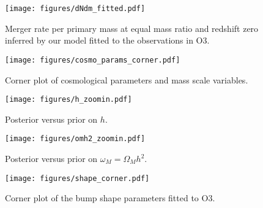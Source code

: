 \documentclass[modern]{aastex631}
\begin{document}
\begin{figure}
    \begin{center}
        \texttt{[image: figures/dNdm\_fitted.pdf]}
    \end{center}
    \caption{Merger rate per primary mass at equal mass ratio and redshift zero inferred by our model fitted to the observations in O3.}
    \label{fig:dNdm_fitted}
\end{figure}

\begin{figure}
    \begin{center}
        \texttt{[image: figures/cosmo\_params\_corner.pdf]}
    \end{center}
    \caption{Corner plot of cosmological parameters and mass scale variables.}
    \label{fig:cosmo-params-corner}
\end{figure}

\begin{figure}
    \begin{center}
        \texttt{[image: figures/h\_zoomin.pdf]}
    \end{center}
    \caption{Posterior versus prior on $h$.}
    \label{fig:h-zoomin}
\end{figure}

\begin{figure}
    \begin{center}
        \texttt{[image: figures/omh2\_zoomin.pdf]}
    \end{center}
    \caption{Posterior versus prior on $\omega_M = \Omega_M h^2$.}
    \label{fig:omh2-zoomin}
\end{figure}

\begin{figure}
    \begin{center}
        \texttt{[image: figures/shape\_corner.pdf]}
    \end{center}
    \caption{Corner plot of the bump shape parameters fitted to O3.}
    \label{fig:shape-corner}
\end{figure}


\end{document}
